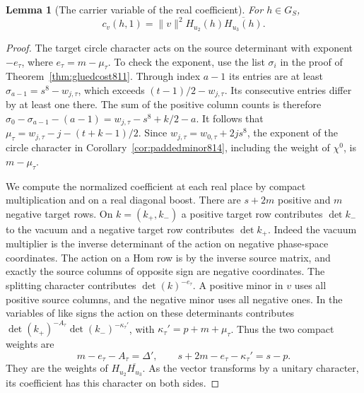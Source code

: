 \documentclass[a4paper,11pt]{article}
\newtheorem{lemma}[proposition]{Lemma}
\theoremstyle{definition}
\theoremstyle{remark}
\numberwithin{equation}{section}
\begin{document}
\begin{lemma}[The carrier variable of the real coefficient]
\leavevmode\label{lem:carriercoefficient815}
For \(h\in G_S\),
\[
 c_v(h,1)=\|v\|^2 H_{u_2}(h)\overline{H_{u_3}(h)} .
\]
\end{lemma}
\begin{proof}
The target circle character acts on the source determinant
with exponent \(-e_\tau\), where \(e_\tau=m-\mu_\tau\).
To check the exponent, use the list \(\sigma_i\) in the proof
of Theorem~\ref{thm:gluedcost811}. Through index \(a-1\)
its entries are at least \(\sigma_{a-1}=s^8-w_{j,\tau}\),
which exceeds \((t-1)/2-w_{j,\tau}\). Its consecutive
entries differ by at least one there. The sum of the positive
column counts is therefore
\(\sigma_0-\sigma_{a-1}-(a-1)
  =w_{j,\tau}-s^8+k/2-a\).
It follows that \(\mu_\tau=w_{j,\tau}-j-(t+k-1)/2\).
Since \(w_{j,\tau}=w_{0,\tau}+2js^8\), the exponent of the
circle character in Corollary~\ref{cor:paddedminor814},
including the weight of \(\chi^0\), is \(m-\mu_\tau\).

We compute the normalized coefficient at each real place
by compact multiplication and on a real diagonal boost.
There are \(s+2m\) positive and \(m\) negative target rows.
On \(k=(k_+,k_-)\) a positive target row contributes
\(\det k_-\) to the vacuum and a negative target row
contributes \(\det k_+\). Indeed the vacuum multiplier is
the inverse determinant of the action on negative
phase-space coordinates. The action on a Hom row is by
the inverse source matrix, and exactly the source columns
of opposite sign are negative coordinates. The splitting
character contributes \(\det(k)^{-e_\tau}\). A positive minor
in \(v\) uses all positive source columns, and the negative
minor uses all negative ones. In the variables of like signs
the action on these determinants contributes
\(\det(k_+)^{-A_\tau}\det(k_-)^{-\kappa_\tau'}\), with
\(\kappa_\tau'=p+m+\mu_\tau\). Thus the two compact
weights are
\[
       m-e_\tau-A_\tau=\Delta',\qquad
       s+2m-e_\tau-\kappa_\tau'=s-p .
\]
They are the weights of \(H_{u_2}\overline{H_{u_3}}\).
As the vector transforms by a unitary character, its
coefficient has this character on both sides.


\end{proof}
\end{document}
